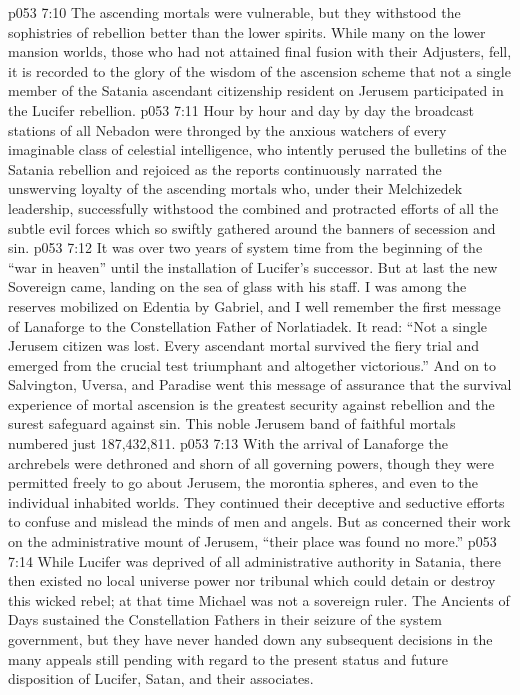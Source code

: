 \vs p053 7:10 \pc The ascending mortals were vulnerable, but they withstood the sophistries of rebellion better than the lower spirits. While many on the lower mansion worlds, those who had not attained final fusion with their Adjusters, fell, it is recorded to the glory of the wisdom of the ascension scheme that not a single member of the Satania ascendant citizenship resident on Jerusem participated in the Lucifer rebellion.
\vs p053 7:11 Hour by hour and day by day the broadcast stations of all Nebadon were thronged by the anxious watchers of every imaginable class of celestial intelligence, who intently perused the bulletins of the Satania rebellion and rejoiced as the reports continuously narrated the unswerving loyalty of the ascending mortals who, under their Melchizedek leadership, successfully withstood the combined and protracted efforts of all the subtle evil forces which so swiftly gathered around the banners of secession and sin.
\vs p053 7:12 It was over two years of system time from the beginning of the “war in heaven” until the installation of Lucifer’s successor. But at last the new Sovereign came, landing on the sea of glass with his staff. I was among the reserves mobilized on Edentia by Gabriel, and I well remember the first message of Lanaforge to the Constellation Father of Norlatiadek. It read: “Not a single Jerusem citizen was lost. Every ascendant mortal survived the fiery trial and emerged from the crucial test triumphant and altogether victorious.” And on to Salvington, Uversa, and Paradise went this message of assurance that the survival experience of mortal ascension is the greatest security against rebellion and the surest safeguard against sin. This noble Jerusem band of faithful mortals numbered just 187,432,811.
\vs p053 7:13 \pc With the arrival of Lanaforge the archrebels were dethroned and shorn of all governing powers, though they were permitted freely to go about Jerusem, the morontia spheres, and even to the individual inhabited worlds. They continued their deceptive and seductive efforts to confuse and mislead the minds of men and angels. But as concerned their work on the administrative mount of Jerusem, “their place was found no more.”
\vs p053 7:14 \pc While Lucifer was deprived of all administrative authority in Satania, there then existed no local universe power nor tribunal which could detain or destroy this wicked rebel; at that time Michael was not a sovereign ruler. The Ancients of Days sustained the Constellation Fathers in their seizure of the system government, but they have never handed down any subsequent decisions in the many appeals still pending with regard to the present status and future disposition of Lucifer, Satan, and their associates.
